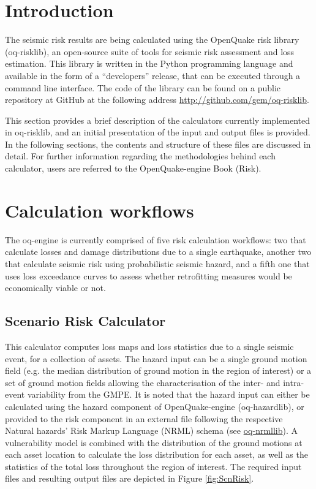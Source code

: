 \section{Introduction}
The seismic risk results are being calculated using the OpenQuake risk library (oq-risklib), an open-source suite of tools for seismic risk assessment and loss estimation. This library is written in the Python programming language and available in the form of a ``developers'' release, that can be executed through a command line interface. The code  of the library can be found on a public repository at GitHub at the following address \href{http://github.com/gem/oq-risklib}{http://github.com/gem/oq-risklib}.

This section provides a brief description of the calculators currently implemented in oq-risklib, and an initial presentation of the input and output files is provided. In the following sections, the contents and structure of these files are discussed in detail. For further information regarding the methodologies behind each calculator, users are referred to the OpenQuake-engine Book (Risk).

\section{Calculation workflows}
\label{sec:riskCalculators}
The oq-engine is currently comprised of five risk calculation workflows: two that calculate losses and damage distributions due to a single earthquake, another two that calculate seismic risk using probabilistic seismic hazard, and a fifth one that uses loss exceedance curves to assess whether retrofitting measures would be economically viable or not.

\subsection{Scenario Risk Calculator}
This calculator computes loss maps and loss statistics due to a single seismic event, for a collection of assets. The hazard input can be a single ground motion field (e.g. the median distribution of ground motion in the region of interest) or a set of ground motion fields allowing the characterisation of the inter- and intra-event variability from the GMPE. It is noted that the hazard input can either be calculated using the hazard component of OpenQuake-engine (oq-hazardlib), or provided to the risk component in an external file following the respective Natural hazards' Risk Markup Language (NRML) schema (see \href{http://github.com/gem/oq-nrmllib}{oq-nrmllib}).
A vulnerability model is combined with the distribution of the ground motions at each asset location to calculate the loss distribution for each asset, as well as the statistics of the total loss throughout the region of interest. The required input files and resulting output files are depicted in Figure \ref{fig:ScnRisk}.


